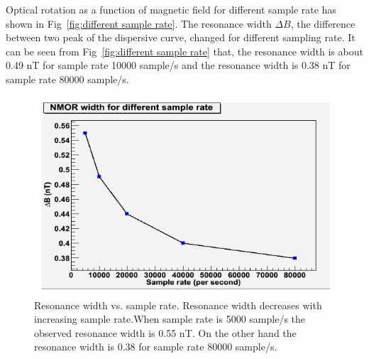 \begin{itemize}
Optical rotation as a function of magnetic field for different sample rate has shown in Fig~\ref{fig:different sample rate}. The resonance width $\Delta B$, the difference between two peak of the dispersive curve, changed for different sampling rate. It can be seen from Fig~\ref{fig:different sample rate} that, the resonance width is about 0.49 nT for sample rate 10000 sample/s and the resonance width is 0.38 nT for sample rate 80000 sample/s.
\begin{figure}[h]
\centering\includegraphics[width=0.6\linewidth]{figures/field_vs_sample_rate}
\caption{Resonance width vs. sample rate. Resonance width decreases with increasing sample rate.When sample rate is 5000 sample/s the observed resonance width is 0.55 nT. On the other hand the resonance width is 0.38 for sample rate 80000 sample/s. \label{fig:resonance width vs. sample rate} }
\end{figure}


\end{itemize}
